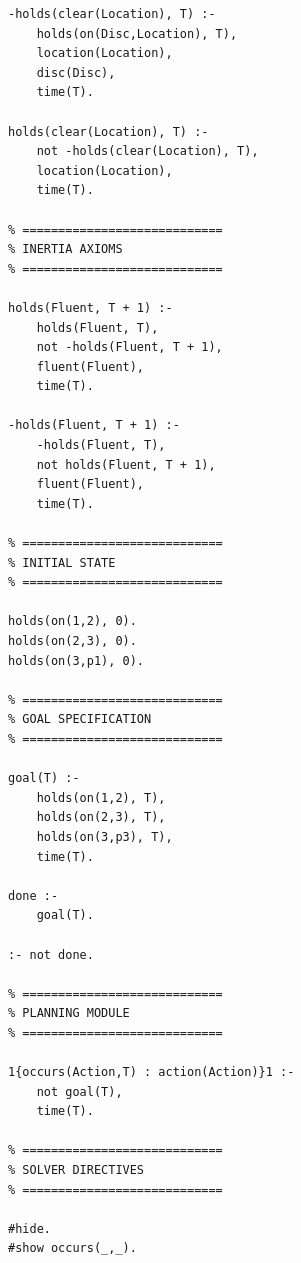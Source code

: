 \documentclass{article}
\begin{document}
{\begin{lstlisting}
-holds(clear(Location), T) :-
    holds(on(Disc,Location), T),
    location(Location),
    disc(Disc),
    time(T).

holds(clear(Location), T) :-
    not -holds(clear(Location), T),
    location(Location),
    time(T).

% ============================
% INERTIA AXIOMS
% ============================

holds(Fluent, T + 1) :-
    holds(Fluent, T),
    not -holds(Fluent, T + 1),
    fluent(Fluent),
    time(T).

-holds(Fluent, T + 1) :-
    -holds(Fluent, T),
    not holds(Fluent, T + 1),
    fluent(Fluent),
    time(T).

% ============================
% INITIAL STATE
% ============================

holds(on(1,2), 0).
holds(on(2,3), 0).
holds(on(3,p1), 0).

% ============================
% GOAL SPECIFICATION
% ============================

goal(T) :-
    holds(on(1,2), T),
    holds(on(2,3), T),
    holds(on(3,p3), T),
    time(T).

done :-
    goal(T).

:- not done.

% ============================
% PLANNING MODULE
% ============================

1{occurs(Action,T) : action(Action)}1 :-
    not goal(T),
    time(T).

% ============================
% SOLVER DIRECTIVES
% ============================

#hide.
#show occurs(_,_).
\end{lstlisting}
}
\end{document}
